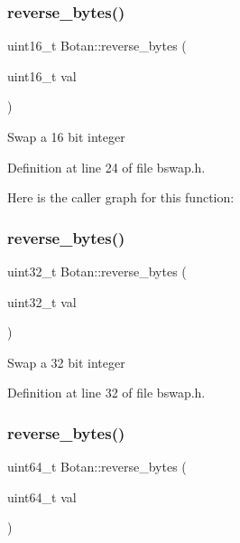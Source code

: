 \subsubsection{\texorpdfstring{reverse\+\_\+bytes()}{reverse\_bytes()}\hspace{0.1cm}{\footnotesize\ttfamily [1/3]}}
{\footnotesize\ttfamily uint16\+\_\+t Botan\+::reverse\+\_\+bytes (\begin{DoxyParamCaption}\item[{uint16\+\_\+t}]{val }\end{DoxyParamCaption})\hspace{0.3cm}{\ttfamily [inline]}}

Swap a 16 bit integer 

Definition at line 24 of file bswap.\+h.

Here is the caller graph for this function\+:
\mbox{\label{namespace_botan_a5c0e57eb245139c321b18d1d242c9e9f}} 
\subsubsection{\texorpdfstring{reverse\+\_\+bytes()}{reverse\_bytes()}\hspace{0.1cm}{\footnotesize\ttfamily [2/3]}}
{\footnotesize\ttfamily uint32\+\_\+t Botan\+::reverse\+\_\+bytes (\begin{DoxyParamCaption}\item[{uint32\+\_\+t}]{val }\end{DoxyParamCaption})\hspace{0.3cm}{\ttfamily [inline]}}

Swap a 32 bit integer 

Definition at line 32 of file bswap.\+h.

\mbox{\label{namespace_botan_ae04de07006f5cfa825328813ea7d3985}} 
\subsubsection{\texorpdfstring{reverse\+\_\+bytes()}{reverse\_bytes()}\hspace{0.1cm}{\footnotesize\ttfamily [3/3]}}
{\footnotesize\ttfamily uint64\+\_\+t Botan\+::reverse\+\_\+bytes (\begin{DoxyParamCaption}\item[{uint64\+\_\+t}]{val }\end{DoxyParamCaption})\hspace{0.3cm}{\ttfamily [inline]}}

